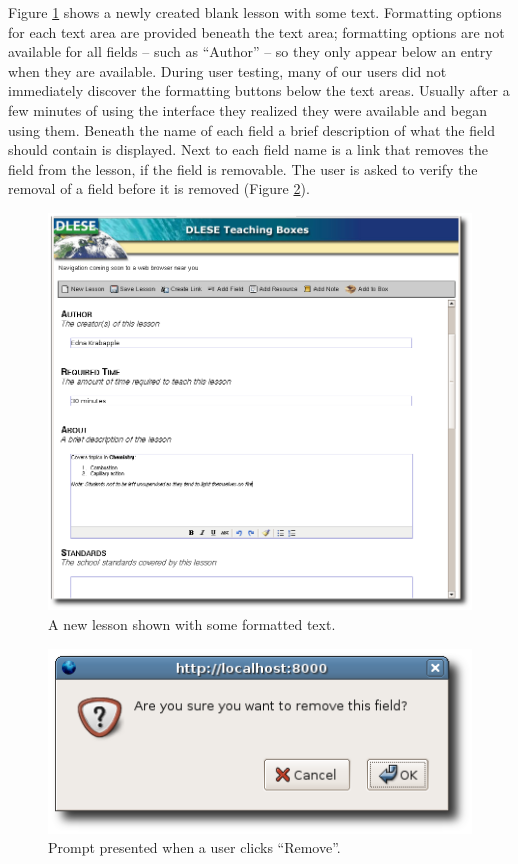 \documentclass[10pt,letter]{article}
\begin{document}
Figure \ref{fig: blank lesson ss} shows a newly created blank lesson with some
text. Formatting options for each text area are provided beneath the text area;
formatting options are not available for all fields -- such as ``Author'' -- so
they only appear below an entry when they are available. During user testing,
many of our users did not immediately discover the formatting buttons below the
text areas. Usually after a few minutes of using the interface they realized
they were available and began using them. Beneath the name of each field a brief
description of what the field should contain is displayed.  Next to each field
name is a link that removes the field from the lesson, if the field is
removable. The user is asked to verify the removal of a field before it is
removed (Figure \ref{fig: remove prompt ss}).

\begin{figure}
	\centering
	\includegraphics[width=0.9\linewidth]{figures/formatting}
	\caption{A new lesson shown with some formatted text.}
	\label{fig: blank lesson ss}
\end{figure}

\begin{figure}
	\centering
	\includegraphics[width=0.45\linewidth]{figures/remove_prompt}
	\caption{Prompt presented when a user clicks ``Remove''.}
	\label{fig: remove prompt ss}
\end{figure}
\end{document}

